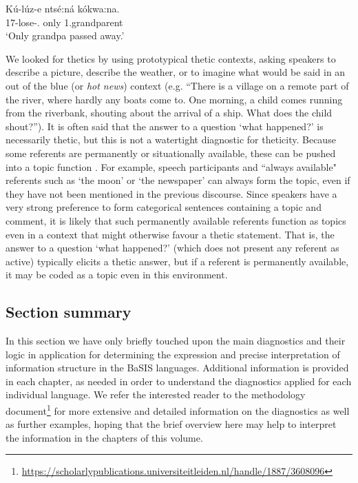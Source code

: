 \documentclass[output=paper]{langscibook}
\begin{document}
\ex
\label{bkm:Ref122698455:b}
\gll
Kú-lúz-e  ntsé:ná  kókwa:na. \\
17\SM{}-lose-\PFV{}.\CJ{}  only  1.grandparent\\
\glt
‘Only grandpa passed away.’\\


\z

\z


We looked for thetics by using prototypical thetic contexts, asking speakers to describe a picture, describe the weather, or to imagine what would be said in an out of the blue (or \textit{hot news}) context (e.g. “There is a village on a remote part of the river, where hardly any boats come to. One morning, a child comes running from the riverbank, shouting about the arrival of a ship. What does the child shout?”). It is often said that the answer to a question ‘what happened?’ is necessarily thetic, but this is not a watertight diagnostic for theticity. Because some referents are permanently or situationally available, these can be pushed into a topic function \citep{Givón1983,Erteschik-Shir2007}. For example, speech participants and ``always available" referents such as ‘the moon’ or ‘the newspaper’ can always form the topic, even if they have not been mentioned in the previous discourse. Since speakers have a very strong preference to form categorical sentences containing a topic and comment, it is likely that such permanently available referents function as topics even in a context that might otherwise favour a thetic statement. That is, the answer to a question ‘what happened?’ (which does not present any referent as active) typically elicits a thetic answer, but if a referent is permanently available, it may be coded as a topic even in this environment.

\subsection{Section summary}

In this section we have only briefly touched upon the main diagnostics and their logic in application for determining the expression and precise interpretation of information structure in the BaSIS languages. Additional information is provided in each chapter, as needed in order to understand the diagnostics applied for each individual language. We refer the interested reader to the methodology document\footnote{\url{https://scholarlypublications.universiteitleiden.nl/handle/1887/3608096}} for more extensive and detailed information on the diagnostics as well as further examples, hoping that the brief overview here may help to interpret the information in the chapters of this volume. 
\end{document}
